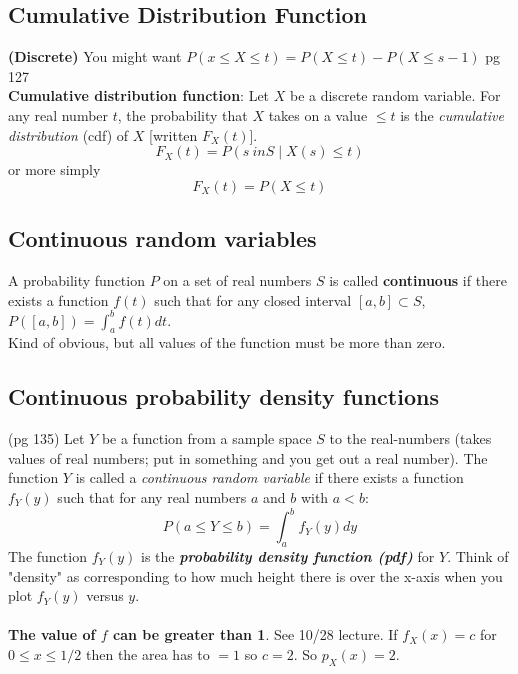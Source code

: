 \subsection{Cumulative Distribution Function} \textbf{(Discrete)}
You might want $P(x \leq X \leq t) = P(X \leq t) - P(X \leq s - 1)$  {\tiny pg 127}  \hfill \\  
\textbf{Cumulative distribution function}:  Let $X$ be a discrete random variable.  For any real number $t$, the probability that $X$ takes on a value $\leq t$ is the \textit{cumulative distribution} (cdf) of $X$ [written $F_X(t)$].
	\[ F_X(t) = P({s \ in S \mid X(s) \leq t}) \]
or more simply 
	\[  F_X(t) = P(X \leq t)  \]
	
\subsection{Continuous random variables}
A probability function $P$ on a set of real numbers $S$ is called \textbf{continuous} if there exists a function $f(t)$ such that for any closed interval $[a, b] \subset S$, $P([a, b]) = \int_{a}^{b} f(t)dt$. \hfill \\  
Kind of obvious, but all values of the function must be more than zero.  \hfill \\  

\subsection{Continuous probability density functions}
{\tiny (pg 135)} Let $Y$ be a function from a sample space $S$ to the real-numbers (takes values of real numbers; put in something and you get out a real number).  The function $Y$ is called a \textit{continuous random variable} if there exists a function $f_Y(y)$ such that for any real numbers $a$ and $b$ with $a < b$:
	\[  P(a \leq Y \leq b) = \int_{a}^{b} f_Y(y)dy \]
The function $f_Y(y)$ is the \textbf{\textit{probability density function (pdf)}} for $Y$.  Think of "density" as corresponding to how much height there is over the x-axis when you plot $f_Y(y)$ versus $y$.  \hfill \\

\hfill \\ 
\textbf{The value of $f$ can be greater than 1}.  {\tiny See 10/28 lecture.}   If $f_X(x) = c$ for $ 0 \leq x \leq 1/2$ then the area has to $= 1$ so $c = 2$.  So $p_X(x) = 2$. 

